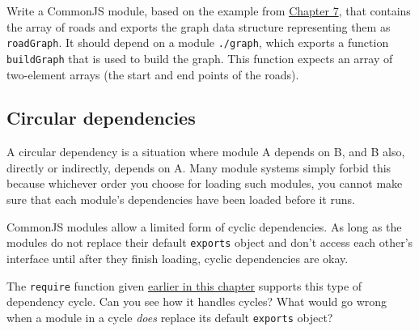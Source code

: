 Write a CommonJS module, based on the example from \hyperref[robot]{Chapter 7}, that contains the array of roads and exports the graph data structure representing them as \lstinline`roadGraph`. It should depend on a module \lstinline`./graph`, which exports a function \lstinline`buildGraph` that is used to build the graph. This function expects an array of two-element arrays (the start and end points of the roads).

\subsection{Circular dependencies}

A circular dependency is a situation where module A depends on B, and B also, directly or indirectly, depends on A. Many module systems simply forbid this because whichever order you choose for loading such modules, you cannot make sure that each module's dependencies have been loaded before it runs.

CommonJS modules allow a limited form of cyclic dependencies. As long as the modules do not replace their default \lstinline`exports` object and don't access each other's interface until after they finish loading, cyclic dependencies are okay.

The \lstinline`require` function given \hyperref[modules.require]{earlier in this chapter} supports this type of dependency cycle. Can you see how it handles cycles? What would go wrong when a module in a cycle \emph{does} replace its default \lstinline`exports` object?

